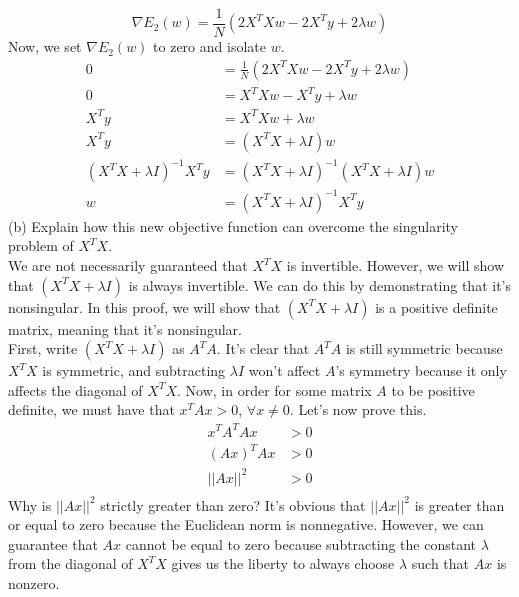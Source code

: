 \documentclass[12pt]{article}
\begin{document}
	\begin{equation*}
	\nabla E_2(w) = \frac{1}{N} (2X^T Xw-2X^T y + 2\lambda w)
	\end{equation*}
	Now, we set $\nabla E_2(w)$ to zero and isolate $w$.
	\begin{align*}
	0 &= \frac{1}{N} (2X^T Xw-2X^T y + 2\lambda w) \\
	0 &= X^T Xw-X^T y + \lambda w \\
	X^T y &= X^T X w + \lambda w	\\
	X^T y &= (X^T X + \lambda I)w \\
	(X^T X + \lambda I)^{-1}X^T y &=(X^T X+\lambda I)^{-1}(X^T X + \lambda I) w \\
	w&=(X^T X + \lambda I)^{-1}X^T y
	\end{align*}
	(b) Explain how this new objective function can overcome the singularity problem
	of $X^T X$. \\
	We are not necessarily guaranteed that $X^T X$ is invertible. However, we will show that $(X^T X + \lambda I)$ is always invertible. We can do this by demonstrating that it's nonsingular. In this proof, we will show that $(X^T X + \lambda I)$ is a positive definite matrix, meaning that it's nonsingular. \\
	First, write $(X^T X + \lambda I)$ as $A^T A$. It's clear that $A^T A$ is still symmetric because $X^T X$ is symmetric, and subtracting $\lambda I$ won't affect $A$'s symmetry because it only affects the diagonal of $X^T X$. Now, in order for some matrix $A$ to be positive definite, we must have that $x^T Ax >0$, $\forall x \ne 0$. Let's now prove this.
	\begin{align*}
	x^T A^T A x &> 0 \\
	(Ax)^T Ax &> 0 \\
	||Ax||^2 &> 0 \\
	\end{align*}
	Why is $||Ax||^2$ strictly greater than zero? It's obvious that $||Ax||^2$ is greater than or equal to zero because the Euclidean norm is nonnegative. However, we can guarantee that $Ax$ cannot be equal to zero because subtracting the constant $\lambda$ from the diagonal of $X^T X$ gives us the liberty to always choose $\lambda$ such that $Ax$ is nonzero.
	\\
\end{document}

